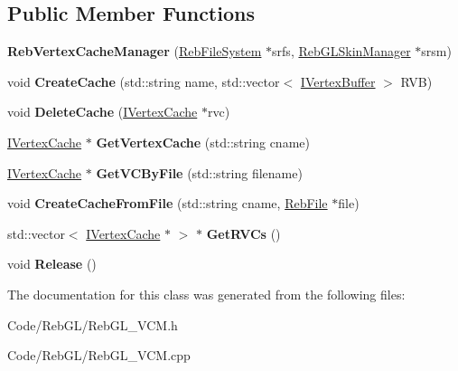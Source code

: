 \subsection*{Public Member Functions}
\begin{DoxyCompactItemize}
\item 
{\bfseries Reb\+Vertex\+Cache\+Manager} (\hyperlink{class_reb_file_system}{Reb\+File\+System} $\ast$srfs, \hyperlink{class_reb_g_l_skin_manager}{Reb\+G\+L\+Skin\+Manager} $\ast$srsm)\hypertarget{class_reb_vertex_cache_manager_a526f482253d5bf70de1db07a22e051f5}{}\label{class_reb_vertex_cache_manager_a526f482253d5bf70de1db07a22e051f5}

\item 
void {\bfseries Create\+Cache} (std\+::string name, std\+::vector$<$ \hyperlink{class_i_vertex_buffer}{I\+Vertex\+Buffer} $>$ R\+VB)\hypertarget{class_reb_vertex_cache_manager_aad7434ff3deeceee8917f5284a55c37a}{}\label{class_reb_vertex_cache_manager_aad7434ff3deeceee8917f5284a55c37a}

\item 
void {\bfseries Delete\+Cache} (\hyperlink{class_i_vertex_cache}{I\+Vertex\+Cache} $\ast$rvc)\hypertarget{class_reb_vertex_cache_manager_a62a50cc87f4cfaddd75ea66221f113ba}{}\label{class_reb_vertex_cache_manager_a62a50cc87f4cfaddd75ea66221f113ba}

\item 
\hyperlink{class_i_vertex_cache}{I\+Vertex\+Cache} $\ast$ {\bfseries Get\+Vertex\+Cache} (std\+::string cname)\hypertarget{class_reb_vertex_cache_manager_a0059fcb52b86a6cd87a300e85d47b0d8}{}\label{class_reb_vertex_cache_manager_a0059fcb52b86a6cd87a300e85d47b0d8}

\item 
\hyperlink{class_i_vertex_cache}{I\+Vertex\+Cache} $\ast$ {\bfseries Get\+V\+C\+By\+File} (std\+::string filename)\hypertarget{class_reb_vertex_cache_manager_a851b08dd6dc8fd523b4964dea80ba89e}{}\label{class_reb_vertex_cache_manager_a851b08dd6dc8fd523b4964dea80ba89e}

\item 
void {\bfseries Create\+Cache\+From\+File} (std\+::string cname, \hyperlink{class_reb_file}{Reb\+File} $\ast$file)\hypertarget{class_reb_vertex_cache_manager_ac5ff2e524a2d50ad28da9bd3aa6b5210}{}\label{class_reb_vertex_cache_manager_ac5ff2e524a2d50ad28da9bd3aa6b5210}

\item 
std\+::vector$<$ \hyperlink{class_i_vertex_cache}{I\+Vertex\+Cache} $\ast$ $>$ $\ast$ {\bfseries Get\+R\+V\+Cs} ()\hypertarget{class_reb_vertex_cache_manager_a4513bce1a7b3bb95d2fc2a5a6ee304cf}{}\label{class_reb_vertex_cache_manager_a4513bce1a7b3bb95d2fc2a5a6ee304cf}

\item 
void {\bfseries Release} ()\hypertarget{class_reb_vertex_cache_manager_ac39614699417ae51821b88058a7576a5}{}\label{class_reb_vertex_cache_manager_ac39614699417ae51821b88058a7576a5}

\end{DoxyCompactItemize}


The documentation for this class was generated from the following files\+:\begin{DoxyCompactItemize}
\item 
Code/\+Reb\+G\+L/Reb\+G\+L\+\_\+\+V\+C\+M.\+h\item 
Code/\+Reb\+G\+L/Reb\+G\+L\+\_\+\+V\+C\+M.\+cpp\end{DoxyCompactItemize}
